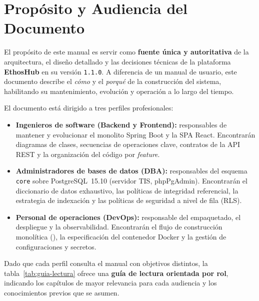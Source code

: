 \section{Propósito y Audiencia del Documento}
\label{sec:proposito}

El propósito de este manual es servir como \textbf{fuente única y autoritativa} de la
arquitectura, el diseño detallado y las decisiones técnicas de la plataforma
\textbf{EthosHub} en su versión \texttt{1.1.0}. A diferencia de un manual de usuario,
este documento describe el \textit{cómo} y el \textit{porqué} de la construcción del
sistema, habilitando su mantenimiento, evolución y operación a lo largo del tiempo.

El documento está dirigido a tres perfiles profesionales:

\begin{itemize}[noitemsep]
    \item \textbf{Ingenieros de software (Backend y Frontend):} responsables de
    mantener y evolucionar el monolito Spring Boot y la SPA React. Encontrarán
    diagramas de clases, secuencias de operaciones clave, contratos de la API REST y
    la organización del código por \textit{feature}.
    \item \textbf{Administradores de bases de datos (DBA):} responsables del esquema
    \texttt{core} sobre PostgreSQL~15.10 (servidor TIS, phpPgAdmin). Encontrarán el diccionario de datos
    exhaustivo, las políticas de integridad referencial, la estrategia de indexación
    y las políticas de seguridad a nivel de fila (RLS).
    \item \textbf{Personal de operaciones (DevOps):} responsable del empaquetado, el
    despliegue y la observabilidad. Encontrarán el flujo de construcción monolítica
    (), la especificación del contenedor Docker y la gestión de
    configuraciones y secretos.
\end{itemize}

Dado que cada perfil consulta el manual con objetivos distintos, la
tabla~\ref{tab:guia-lectura} ofrece una \textbf{guía de lectura orientada por rol},
indicando los capítulos de mayor relevancia para cada audiencia y los conocimientos
previos que se asumen.

